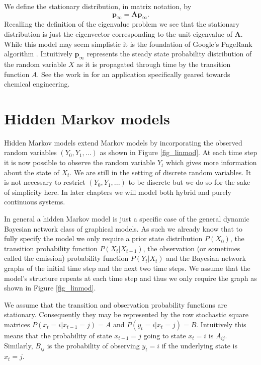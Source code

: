 We define the stationary distribution, in matrix notation, by \begin{equation}
\mathbf{p}_{\infty} = \mathbf{A}\mathbf{p}_{\infty}.
\label{eq_markov_chain_stationary}
\end{equation}
Recalling the definition of the eigenvalue problem we see that the stationary distribution is just the eigenvector corresponding to the unit eigenvalue of $\mathbf{A}$. While this model may seem simplistic it is the foundation of Google's PageRank algorithm \cite{google}.  Intuitively $\mathbf{p}_\infty$ represents the steady state probability distribution of the random variable $X$ as it is propagated through time by the transition function $A$. See the work in \cite{streicher} for an application specifically geared towards chemical engineering.

\section{Hidden Markov models}
Hidden Markov models extend Markov models by incorporating the observed random variables $(Y_0, Y_1,...)$ as shown in Figure \ref{fig_linmod}. At each time step it is now possible to observe the random variable $Y_t$ which gives more information about the state of $X_t$. We are still in the setting of discrete random variables. It is not necessary to restrict $(Y_0, Y_1,...)$ to be discrete but we do so for the sake of simplicity here. In later chapters we will model both hybrid and purely continuous systems. 

In general a hidden Markov model is just a specific case of the general dynamic Bayesian network class of graphical models. As such we already know that to fully specify the model we only require a prior state distribution $P(X_0)$, the transition probability function $P(X_t|X_{t-1})$, the observation (or sometimes called the emission) probability function $P(Y_t|X_t)$ and the Bayesian network graphs of the initial time step and the next two time steps. We assume that the model's structure repeats at each time step and thus we only require the graph as shown in Figure \ref{fig_linmod}.

We assume that the transition and observation probability functions are stationary. Consequently they may be represented by the row stochastic square matrices $P(x_t=i|x_{t-1}=j) = A$ and $P(y_t=i|x_t=j) = B$. Intuitively this means that the probability of state $x_{t-1}=j$ going to state $x_{t} = i$ is $A_{ij}$. Similarly, $B_{ij}$ is the probability of observing $y_t=i$ if the underlying state is $x_t=j$.

